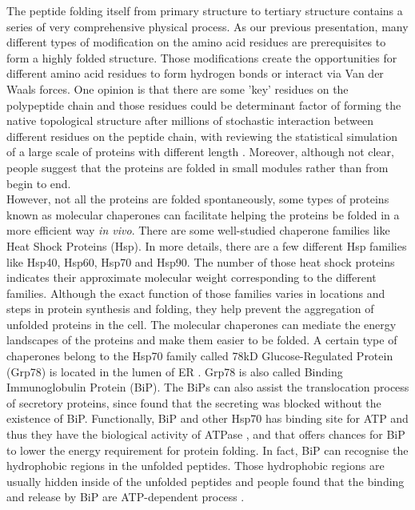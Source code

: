 The peptide folding itself from primary structure to tertiary structure contains a series of very comprehensive physical process. As our previous presentation, many different types of modification on the amino acid residues are prerequisites to form a highly folded structure. Those modifications create the opportunities for different amino acid residues to form hydrogen bonds or interact via Van der Waals forces. One opinion is that there are some 'key' residues on the polypeptide chain and those residues could be determinant factor of forming the native topological structure after millions of stochastic interaction between different residues on the peptide chain, with reviewing the statistical simulation of a large scale of proteins with different length \citep{dobson2003protein}. Moreover, although not clear, people suggest that the proteins are folded in small modules rather than from begin to end.\\ 
However, not all the proteins are folded spontaneously, some types of proteins known as molecular chaperones can facilitate helping the proteins be folded in a more efficient way \textit{in vivo}. There are some well-studied chaperone families like Heat Shock Proteins (Hsp). In more details, there are a few different Hsp families like Hsp40, Hsp60, Hsp70 and Hsp90. The number of those heat shock proteins indicates their approximate molecular weight corresponding to the different families. Although the exact function of those families varies in locations and steps in protein synthesis and folding, they help prevent the aggregation of unfolded proteins in the cell. The molecular chaperones can mediate the energy landscapes of the proteins and make them easier to be folded. A certain type of chaperones belong to the Hsp70 family called 78kD Glucose-Regulated Protein (Grp78) is located in the lumen of ER \citep{munro1986hsp70}. Grp78 is also called Binding Immunoglobulin Protein (BiP). The BiPs can also assist the translocation process of secretory proteins, since \citet{vogel1990loss} found that the secreting was blocked without the existence of BiP. Functionally, BiP and other Hsp70 has binding site for ATP and thus they have the biological activity of ATPase \citep{chappell1986uncoating}, and that offers chances for BiP to lower the energy requirement for protein folding. In fact, BiP can recognise the hydrophobic regions in the unfolded peptides. Those hydrophobic regions are usually hidden inside of the unfolded peptides and people found that the binding and release by BiP are ATP-dependent process \citep{bukau1998hsp70}. 

